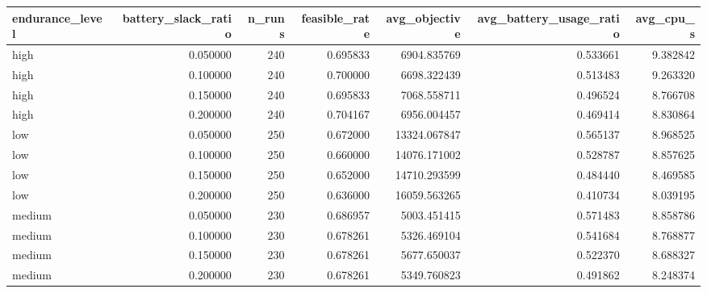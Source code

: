 \begin{tabular}{lrrrrrr}
\toprule
endurance_level & battery_slack_ratio & n_runs & feasible_rate & avg_objective & avg_battery_usage_ratio & avg_cpu_s \\
\midrule
high & 0.050000 & 240 & 0.695833 & 6904.835769 & 0.533661 & 9.382842 \\
high & 0.100000 & 240 & 0.700000 & 6698.322439 & 0.513483 & 9.263320 \\
high & 0.150000 & 240 & 0.695833 & 7068.558711 & 0.496524 & 8.766708 \\
high & 0.200000 & 240 & 0.704167 & 6956.004457 & 0.469414 & 8.830864 \\
low & 0.050000 & 250 & 0.672000 & 13324.067847 & 0.565137 & 8.968525 \\
low & 0.100000 & 250 & 0.660000 & 14076.171002 & 0.528787 & 8.857625 \\
low & 0.150000 & 250 & 0.652000 & 14710.293599 & 0.484440 & 8.469585 \\
low & 0.200000 & 250 & 0.636000 & 16059.563265 & 0.410734 & 8.039195 \\
medium & 0.050000 & 230 & 0.686957 & 5003.451415 & 0.571483 & 8.858786 \\
medium & 0.100000 & 230 & 0.678261 & 5326.469104 & 0.541684 & 8.768877 \\
medium & 0.150000 & 230 & 0.678261 & 5677.650037 & 0.522370 & 8.688327 \\
medium & 0.200000 & 230 & 0.678261 & 5349.760823 & 0.491862 & 8.248374 \\
\bottomrule
\end{tabular}
